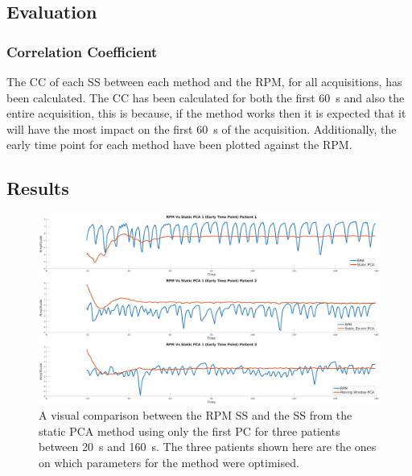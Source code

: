             \subsection{Evaluation} \label{sec:pca_data_driven_surrogate_signal_extraction_methods_for_dynamic_pet_methods_evaluation}
                \subsubsection{Correlation Coefficient} \label{sec:pca_data_driven_surrogate_signal_extraction_methods_for_dynamic_pet_methods_cross_correlation}
                    The \gls{CC} of each \gls{SS} between each method and the \gls{RPM}, for all acquisitions, has been calculated. The \gls{CC} has been calculated for both the first \SI{60}{\second} and also the entire acquisition, this is because, if the method works then it is expected that it will have the most impact on the first \SI{60}{\second} of the acquisition. Additionally, the early time point  for each method have been plotted against the \gls{RPM}.
            
        \subsection{Results} \label{sec:pca_data_driven_surrogate_signal_extraction_methods_for_dynamic_pet_results}
            \begin{figure}
                \centering
                
                \includegraphics[width=1.0\linewidth]{figures/data_driven_surrogate_signal_extraction_results_1_vanilla_surrogate_signal.png}
                
                \captionsetup{singlelinecheck=false, justification=centering}
                \caption{A visual comparison between the \gls{RPM} \gls{SS} and the \gls{SS} from the static \gls{PCA} method using only the first \gls{PC} for three patients between \SI{20}{\second} and \SI{160}{\second}. The three patients shown here are the ones on which parameters for the method were optimised.}
                \label{fig:pca_data_driven_surrogate_signal_extraction_methods_for_dynamic_pet_results_vanilla_surrogate_signal}
            \end{figure}
            
